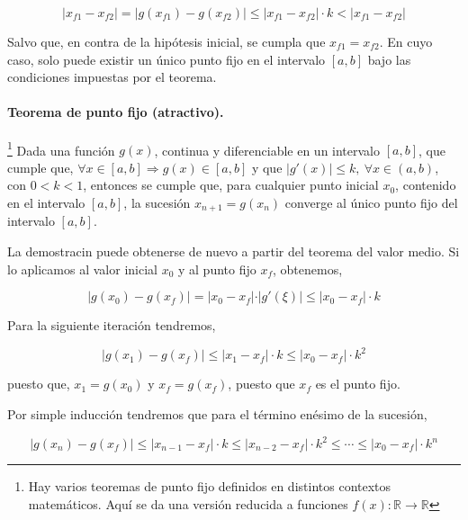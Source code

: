  \begin{equation*}
\vert x_{f1}-x_{f2}\vert=\vert g(x_{f1})-g(x_{f2}) \vert  \leq \vert x_{f1}-x_{f2} \vert\cdot k < \vert x_{f1}-x_{f2} \vert 
\end{equation*}

Salvo que, en contra de la hipótesis inicial, se cumpla que  $ x_{f1}=x_{f2}$. En cuyo caso, solo puede existir un único punto fijo en el intervalo $[a, b]$ bajo las condiciones impuestas por el teorema.

\paragraph{Teorema de punto fijo (atractivo).} \footnote{Hay varios teoremas de punto fijo definidos en distintos contextos matemáticos. Aquí se da una versión reducida a funciones $f(x):\mathbb{R} \rightarrow \mathbb{R}$} Dada una función $g(x)$,  continua y diferenciable en un intervalo $[a, b]$, que  cumple que, $\forall x \in [a, b] \Rightarrow g(x)\in [a,b]$ y que  $\vert g'(x) \vert \leq k, \  \forall x \in (a, b)$, con $0<k<1$, entonces se cumple que, para cualquier punto inicial $x_0$, contenido en el intervalo $[a, b]$, la sucesión  $x_{n+1}=g(x_n)$ converge al único punto fijo del intervalo $[a, b]$.

La demostracin puede obtenerse de nuevo a partir del teorema del valor medio.  Si lo aplicamos al valor inicial $x_0$ y al punto fijo $x_f$, obtenemos,

\begin{equation*}
\vert g(x_0)-g(x_f) \vert =\vert x_0-x_f \vert \cdot \vert g'(\xi) \vert \leq \vert x_0-x_f \vert \cdot k 
\end{equation*}

Para la siguiente iteración tendremos,

\begin{equation*}
\vert g(x_1)-g(x_f) \vert \leq \vert x_1-x_f \vert \cdot k \leq \vert x_0-x_f \vert \cdot k^2 
\end{equation*}

puesto que,  $x_1=g(x_0)$ y $x_f = g(x_f)$, puesto que $x_f$ es el punto fijo. 

Por simple inducción tendremos que para el término enésimo de la sucesión,

\begin{equation*}
\vert g(x_n)-g(x_f) \vert \leq \vert x_{n-1}-x_f \vert \cdot k \leq \vert x_{n-2}-x_f \vert \cdot k^2 \leq \cdots \leq  \vert x_0-x_f \vert \cdot k^n 
\end{equation*}

